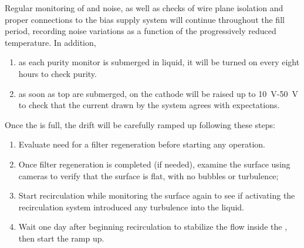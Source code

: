 Regular monitoring of  and  noise, as well as checks of wire plane isolation and proper connections to the bias supply system will continue throughout the fill period, recording noise variations as a function of the progressively reduced temperature. In addition,

\begin{enumerate}

    \item as each purity monitor is submerged in liquid, it will be turned on every eight hours to check  purity. 
    
    \item as soon as top  are submerged,  on the cathode will be raised up to \SI{10}{V}-\SI{50}{V} to check that the current drawn by the system agrees with expectations.

\end{enumerate}

Once the  is full, the drift  will be carefully ramped up following these steps:

\begin{enumerate}

    \item Evaluate need for a filter regeneration before starting any operation.

    \item Once filter regeneration is completed (if needed), examine the  surface 
    using cameras to verify that the surface is flat, with no bubbles or turbulence;
    
    \item Start  recirculation while monitoring the  surface 
    again to see if activating the recirculation system introduced any turbulence into the liquid.
    
    \item Wait one day after beginning  recirculation to stabilize the  flow inside the , then start the  ramp up.
    
\end{enumerate}

